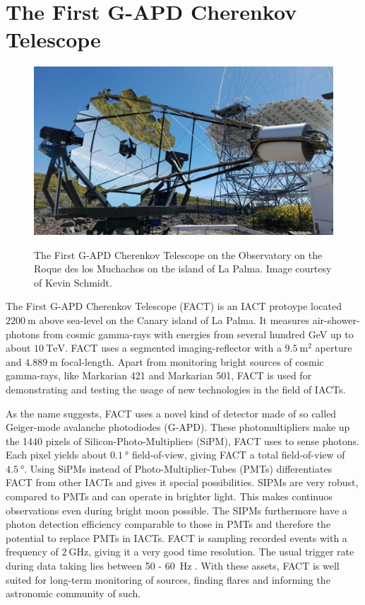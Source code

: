 \chapter{The First G-APD Cherenkov Telescope}\label{ch:fact}
%
\begin{figure}
  \centering
  \includegraphics[width=\textwidth]{Plots/fact.jpg}
  \label{fig:fact}
  \caption{The First G-APD Cherenkov Telescope on the Observatory on the Roque des los Muchachos on the island of La Palma. Image courtesy of Kevin Schmidt.}
\end{figure}
%
The First G-APD Cherenkov Telescope \cite{FACT-Design} (FACT) is an IACT
protoype located $\SI{2200}{\metre}$ above sea-level on the Canary island of La
Palma. It measures air-shower-photons from cosmic gamma-rays with energies from
several hundred GeV up to about $\SI{10}{\tera\electronvolt}$. FACT uses a
segmented imaging-reflector with a $\SI{9.5}{\meter\squared}$ aperture and
$\SI{4.889}{\meter}$ focal-length. Apart from monitoring bright sources of
cosmic gamma-rays, like Markarian 421 and Markarian 501, FACT is used for
demonstrating and testing the usage of new technologies in the field of IACTs.

As the name suggests, FACT uses a novel kind of detector made of so called
Geiger-mode avalanche photodiodes (G-APD). These photomultipliers make up
the 1440 pixels of Silicon-Photo-Multipliers (SiPM), FACT uses to sense
photons. Each pixel yields about $\SI{0.1}{\degree}$ field-of-view, giving FACT
a total field-of-view of $\SI{4.5}{\degree}$. Using SiPMs instead of
Photo-Multiplier-Tubes (PMTs) differentiates FACT from other IACTs and gives it
special possibilities. SIPMs are very robust, compared to PMTs and can operate
in brighter light. This makes continuos observations even during bright moon
possible. The SIPMs furthermore have a photon detection efficiency comparable to those in PMTs and therefore the potential to replace PMTs in IACTs. FACT is sampling recorded
events with a frequency of $\SI{2}{\giga\hertz}$, giving it a very good time
resolution. The usual trigger rate during data taking lies between \num{50} - \SI{60}{\hertz} \cite{FACT-Design}. With these assets, FACT is well suited for long-term monitoring of
sources, finding flares and informing the astronomic community of such.
